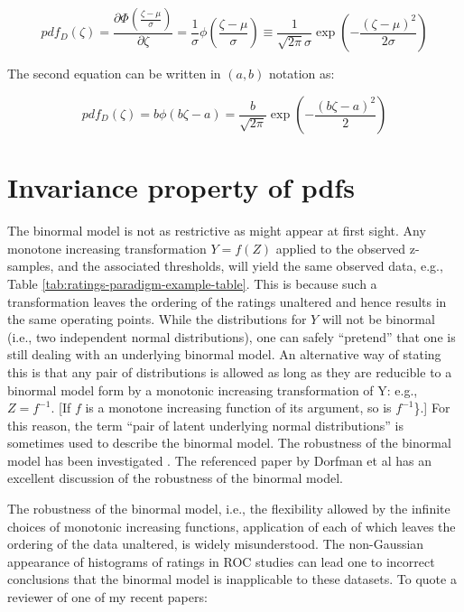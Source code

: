 \documentclass[
]{book}
\begin{document}
\begin{equation*} 
pdf_D\left ( \zeta \right ) = \frac{\partial \Phi\left ( \frac{\zeta - \mu}{\sigma} \right )}{\partial \zeta} = \frac{1}{\sigma} \phi\left ( \frac{\zeta - \mu}{\sigma} \right ) \equiv \frac{1}{\sqrt{2 \pi}\sigma}\exp\left ( -\frac{\left (\zeta-\mu  \right )^2}{2\sigma} \right )
\end{equation*}

The second equation can be written in \((a,b)\) notation as:

\begin{equation*} 
pdf_D\left ( \zeta \right ) = b\phi\left ( b\zeta-a \right ) = \frac{b}{\sqrt{2 \pi}}\exp\left ( -\frac{\left (b\zeta - a \right )^2}{2} \right )
\end{equation*}

\hypertarget{binormal-model-invariance-property}{%
\section{Invariance property of pdfs}\label{binormal-model-invariance-property}}

The binormal model is not as restrictive as might appear at first sight. Any monotone increasing transformation \(Y=f(Z)\) applied to the observed z-samples, and the associated thresholds, will yield the same observed data, e.g., Table \ref{tab:ratings-paradigm-example-table}. This is because such a transformation leaves the ordering of the ratings unaltered and hence results in the same operating points. While the distributions for \(Y\) will not be binormal (i.e., two independent normal distributions), one can safely ``pretend'' that one is still dealing with an underlying binormal model. An alternative way of stating this is that any pair of distributions is allowed as long as they are reducible to a binormal model form by a monotonic increasing transformation of Y: e.g., \(Z=f^{-1}\). {[}If \(f\) is a monotone increasing function of its argument, so is \(f^{-1}\)\}.{]} For this reason, the term ``pair of latent underlying normal distributions'' is sometimes used to describe the binormal model. The robustness of the binormal model has been investigated \citep{hanley1988robustness, dorfman1997proper}. The referenced paper by Dorfman et al has an excellent discussion of the robustness of the binormal model.

The robustness of the binormal model, i.e., the flexibility allowed by the infinite choices of monotonic increasing functions, application of each of which leaves the ordering of the data unaltered, is widely misunderstood. The non-Gaussian appearance of histograms of ratings in ROC studies can lead one to incorrect conclusions that the binormal model is inapplicable to these datasets. To quote a reviewer of one of my recent papers:
\end{document}
